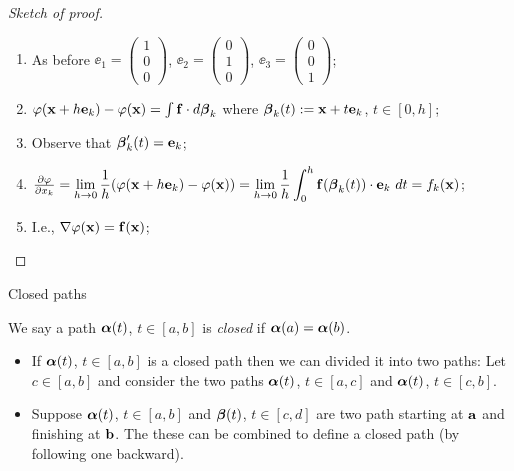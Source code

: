 \begin{proof}[Sketch of proof]
    \begin{enumerate}
        \item As before \(\ee_1 = \left(\begin{smallmatrix}
                  1 \\ 0 \\ 0
              \end{smallmatrix}\right) \),
              \(\ee_2 = \left(\begin{smallmatrix}
                  0 \\ 1 \\ 0
              \end{smallmatrix}\right) \),
              \(\ee_3 = \left(\begin{smallmatrix}
                  0 \\ 0 \\ 1
              \end{smallmatrix}\right) \);
        \item \(\varphi(\xx + h \ee_k) - \varphi(\xx) = \int \ff \cdot d\bbeta_k\) where \(\bbeta_k(t) := \xx + t \ee_k\), \(t\in [0,h]\);
        \item Observe that \(\bbeta'_k(t) = \ee_k\);
        \item \(\frac{\partial \varphi}{\partial x_k} =  \displaystyle\lim_{h\to 0} \frac{1}{h}( \varphi(\xx + h \ee_k) - \varphi(\xx)) = \displaystyle \lim_{h\to 0} \frac{1}{h} \int_0^h \ff(\bbeta_k(t)) \cdot \ee_k \ dt = f_k(\xx)  \);
        \item I.e., \(\nabla \varphi (\xx) =  \ff(\xx)\);
    \end{enumerate}
\end{proof}





{Closed paths}

\begin{definition}
    We say a path \(\aalpha(t)\), \(t\in [a,b]\) is \emph{closed} if \(\aalpha(a) = \aalpha(b)\).
\end{definition}



\begin{itemize}
    \item If \(\aalpha(t)\), \(t\in[a,b]\) is a closed path then we can divided it into two paths: Let \(c\in[a,b]\) and consider the two paths \(\aalpha(t)\), \(t\in[a,c]\) and  \(\aalpha(t)\), \(t\in[c,b]\).
    \item Suppose \(\aalpha(t)\), \(t\in [a,b]\) and  \(\bbeta(t)\), \(t\in [c,d]\) are two path starting at \(\aa\) and finishing at \(\bb\). The these can be combined to define a closed path (by following one backward).
\end{itemize}





